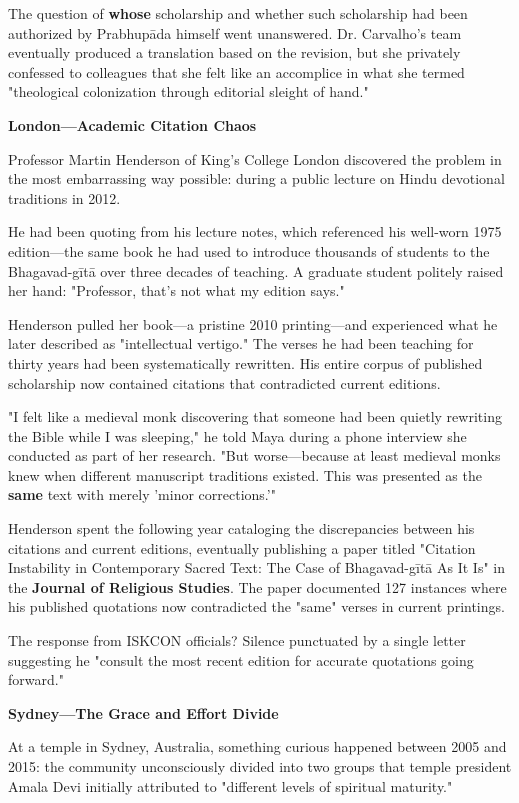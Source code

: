 \documentclass[12pt,twoside]{book}
\begin{document}
The question of \textbf{whose} scholarship and whether such scholarship had been authorized by Prabhupāda himself went unanswered. Dr. Carvalho's team eventually produced a translation based on the revision, but she privately confessed to colleagues that she felt like an accomplice in what she termed "theological colonization through editorial sleight of hand."

\textbf{\textbf{London—Academic Citation Chaos}}

Professor Martin Henderson of King's College London discovered the problem in the most embarrassing way possible: during a public lecture on Hindu devotional traditions in 2012.

He had been quoting from his lecture notes, which referenced his well-worn 1975 edition—the same book he had used to introduce thousands of students to the Bhagavad-gītā over three decades of teaching. A graduate student politely raised her hand: "Professor, that's not what my edition says."

Henderson pulled her book—a pristine 2010 printing—and experienced what he later described as "intellectual vertigo." The verses he had been teaching for thirty years had been systematically rewritten. His entire corpus of published scholarship now contained citations that contradicted current editions.

"I felt like a medieval monk discovering that someone had been quietly rewriting the Bible while I was sleeping," he told Maya during a phone interview she conducted as part of her research. "But worse—because at least medieval monks knew when different manuscript traditions existed. This was presented as the \textbf{same} text with merely 'minor corrections.'"

Henderson spent the following year cataloging the discrepancies between his citations and current editions, eventually publishing a paper titled "Citation Instability in Contemporary Sacred Text: The Case of Bhagavad-gītā As It Is" in the \textbf{Journal of Religious Studies}. The paper documented 127 instances where his published quotations now contradicted the "same" verses in current printings.

The response from ISKCON officials? Silence punctuated by a single letter suggesting he "consult the most recent edition for accurate quotations going forward."

\textbf{\textbf{Sydney—The Grace and Effort Divide}}

At a temple in Sydney, Australia, something curious happened between 2005 and 2015: the community unconsciously divided into two groups that temple president Amala Devi initially attributed to "different levels of spiritual maturity."
\end{document}
